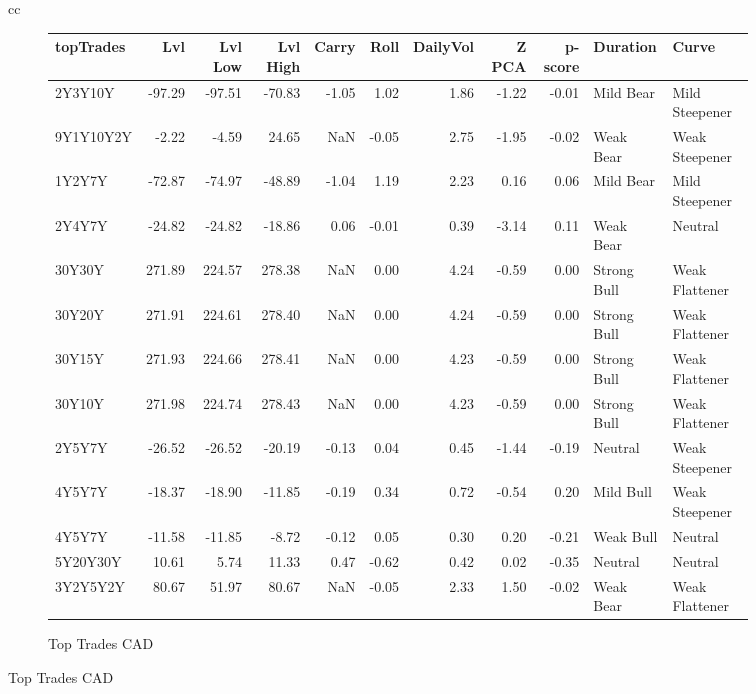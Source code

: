 \documentclass[a4paper,twoside]{report}
\begin{document}
\begin{figure}[htbp]
\begin{tabular}[c]{cc}
\begin{subfigure}[c]{0.5\textwidth}
\caption{Top Trades CAD}
\label{fig:TopTrades CAD}
\begin{adjustbox}{max width=\textwidth}
\begin{tabular}{lrrrrrrrrll}
\hline
    topTrades &     Lvl &  Lvl Low &  Lvl High &  Carry &  Roll &  DailyVol &  Z PCA &  p-score &     Duration &           Curve \\
\hline
      2Y3Y10Y &  -97.29 &   -97.51 &    -70.83 &  -1.05 &  1.02 &      1.86 &  -1.22 &    -0.01 &    Mild Bear &  Mild Steepener \\
    9Y1Y10Y2Y &   -2.22 &    -4.59 &     24.65 &    NaN & -0.05 &      2.75 &  -1.95 &    -0.02 &    Weak Bear &  Weak Steepener \\
       1Y2Y7Y &  -72.87 &   -74.97 &    -48.89 &  -1.04 &  1.19 &      2.23 &   0.16 &     0.06 &    Mild Bear &  Mild Steepener \\
       2Y4Y7Y &  -24.82 &   -24.82 &    -18.86 &   0.06 & -0.01 &      0.39 &  -3.14 &     0.11 &    Weak Bear &         Neutral \\
       30Y30Y &  271.89 &   224.57 &    278.38 &    NaN &  0.00 &      4.24 &  -0.59 &     0.00 &  Strong Bull &  Weak Flattener \\
       30Y20Y &  271.91 &   224.61 &    278.40 &    NaN &  0.00 &      4.24 &  -0.59 &     0.00 &  Strong Bull &  Weak Flattener \\
       30Y15Y &  271.93 &   224.66 &    278.41 &    NaN &  0.00 &      4.23 &  -0.59 &     0.00 &  Strong Bull &  Weak Flattener \\
       30Y10Y &  271.98 &   224.74 &    278.43 &    NaN &  0.00 &      4.23 &  -0.59 &     0.00 &  Strong Bull &  Weak Flattener \\
       2Y5Y7Y &  -26.52 &   -26.52 &    -20.19 &  -0.13 &  0.04 &      0.45 &  -1.44 &    -0.19 &      Neutral &  Weak Steepener \\
       4Y5Y7Y &  -18.37 &   -18.90 &    -11.85 &  -0.19 &  0.34 &      0.72 &  -0.54 &     0.20 &    Mild Bull &  Weak Steepener \\
       4Y5Y7Y &  -11.58 &   -11.85 &     -8.72 &  -0.12 &  0.05 &      0.30 &   0.20 &    -0.21 &    Weak Bull &         Neutral \\
     5Y20Y30Y &   10.61 &     5.74 &     11.33 &   0.47 & -0.62 &      0.42 &   0.02 &    -0.35 &      Neutral &         Neutral \\
     3Y2Y5Y2Y &   80.67 &    51.97 &     80.67 &    NaN & -0.05 &      2.33 &   1.50 &    -0.02 &    Weak Bear &  Weak Flattener \\

\end{tabular}
\end{adjustbox}
\end{subfigure}
\end{tabular}
\end{figure}
\end{document}
